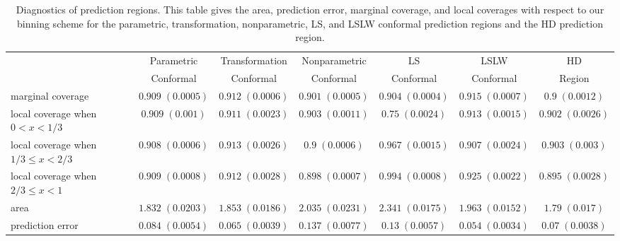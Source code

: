 \documentclass[11pt]{article}\usepackage[]{graphicx}\usepackage[]{color}
\begin{document}
\begin{table}[t!]
\tiny
\begin{center}
\begin{tabular}{lcccccc}
  & Parametric & Transformation & Nonparametric & LS        & LSLW      & HD     \\  
  & Conformal  & Conformal      & Conformal     & Conformal & Conformal & Region \\
    marginal coverage & 
  $0.909 \; (0.0005)$ & 
  $0.912 \; (0.0006)$ & 
  $0.901 \; (0.0005)$ & 
  $0.904 \; (0.0004)$ & 
  $0.915 \; (0.0007)$ &
  $0.9 \; (0.0012)$ \\ 
    local coverage when $0 < x < 1/3$ & 
  $0.909 \; (0.001)$ & 
  $0.911 \; (0.0023)$ & 
  $0.903 \; (0.0011)$ & 
  $0.75 \; (0.0024)$ & 
  $0.913 \; (0.0015)$ &
  $0.902 \; (0.0026)$ \\
    local coverage when $1/3 \leq x < 2/3$ & 
  $0.908 \; (0.0006)$ & 
  $0.913 \; (0.0026)$ & 
  $0.9 \; (0.0006)$ & 
  $0.967 \; (0.0015)$ & 
  $0.907 \; (0.0024)$ &
  $0.903 \; (0.003)$ \\
    local coverage when $2/3 \leq x < 1$ & 
  $0.909 \; (0.0008)$ & 
  $0.912 \; (0.0028)$ & 
  $0.898 \; (0.0007)$ & 
  $0.994 \; (0.0008)$ & 
  $0.925 \; (0.0022)$ & 
  $0.895 \; (0.0028)$ \\
    area & 
  $1.832 \; (0.0203)$ & 
  $1.853 \; (0.0186)$ & 
  $2.035 \; (0.0231)$ & 
  $2.341 \; (0.0175)$ & 
  $1.963 \; (0.0152)$ & 
  $1.79 \; (0.017)$ \\
    prediction error & 
  $0.084 \; (0.0054)$ & 
  $0.065 \; (0.0039)$ & 
  $0.137 \; (0.0077)$ & 
  $0.13 \; (0.0057)$ & 
  $0.054 \; (0.0034)$ & 
  $0.07 \; (0.0038)$ 
\end{tabular}
\end{center}
\caption{Diagnostics of prediction regions. This table gives 
    the area, prediction error, marginal coverage, and local coverages with 
    respect to our binning scheme for the parametric, transformation, 
    nonparametric, LS, and LSLW conformal prediction regions and the HD 
    prediction region.}
\label{Tab:gamma-results}
\end{table}
\end{document}
